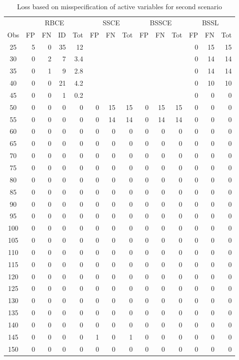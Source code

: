 \documentclass[preprint,12pt]{elsarticle}
\begin{document}
\begin{table}
\small
\caption{Loss based on misspecification of active variables for second scenario}
\label{tab:misspec2}
\begin{tabular}{|c||rrr|r||rr|r||rr|r||rr|r|}
  \hline
  &\multicolumn{4}{c||}{RBCE}&\multicolumn{3}{c||}{SSCE}
  &\multicolumn{3}{c||}{BSSCE}&\multicolumn{3}{c|}{BSSL}\\
  \cline{2-14}
 Obs & FP & FN & ID & Tot & FP & FN & Tot & FP & FN & Tot & FP & FN & Tot \\ 
  \hline
25 &   5 & 0 & 35 & 12 &  &  &  &  &  &  & 0 & 15 & 15 \\ 
  30 & 0 & 2 & 7 & 3.4 &  &  &  &  &  &  & 0 & 14 & 14 \\ 
  35 & 0 & 1 & 9 & 2.8 &  &  &  &  &  &  & 0 & 14 & 14 \\ 
  40 & 0 & 0 & 21 & 4.2 &  &  &  &  &  &  & 0 & 10 & 10 \\ 
  45 & 0 & 0 & 1 & 0.2 &  &  &  &  &  &  & 0 & 0 & 0 \\ 
  50 & 0 & 0 & 0 & 0 & 0 & 15 & 15 & 0 & 15 & 15 & 0 & 0 & 0 \\ 
  55 & 0 & 0 & 0 & 0 & 0 & 14 & 14 & 0 & 14 & 14 & 0 & 0 & 0 \\ 
  60 & 0 & 0 & 0 & 0 & 0 & 0 & 0 & 0 & 0 & 0 & 0 & 0 & 0 \\ 
  65 & 0 & 0 & 0 & 0 & 0 & 0 & 0 & 0 & 0 & 0 & 0 & 0 & 0 \\ 
  70 & 0 & 0 & 0 & 0 & 0 & 0 & 0 & 0 & 0 & 0 & 0 & 0 & 0 \\ 
  75 & 0 & 0 & 0 & 0 & 0 & 0 & 0 & 0 & 0 & 0 & 0 & 0 & 0 \\ 
  80 & 0 & 0 & 0 & 0 & 0 & 0 & 0 & 0 & 0 & 0 & 0 & 0 & 0 \\ 
  85 & 0 & 0 & 0 & 0 & 0 & 0 & 0 & 0 & 0 & 0 & 0 & 0 & 0 \\ 
  90 & 0 & 0 & 0 & 0 & 0 & 0 & 0 & 0 & 0 & 0 & 0 & 0 & 0 \\ 
  95 & 0 & 0 & 0 & 0 & 0 & 0 & 0 & 0 & 0 & 0 & 0 & 0 & 0 \\ 
  100 & 0 & 0 & 0 & 0 & 0 & 0 & 0 & 0 & 0 & 0 & 0 & 0 & 0 \\ 
  105 & 0 & 0 & 0 & 0 & 0 & 0 & 0 & 0 & 0 & 0 & 0 & 0 & 0 \\ 
  110 & 0 & 0 & 0 & 0 & 0 & 0 & 0 & 0 & 0 & 0 & 0 & 0 & 0 \\ 
  115 & 0 & 0 & 0 & 0 & 0 & 0 & 0 & 0 & 0 & 0 & 0 & 0 & 0 \\ 
  120 & 0 & 0 & 0 & 0 & 0 & 0 & 0 & 0 & 0 & 0 & 0 & 0 & 0 \\ 
  125 & 0 & 0 & 0 & 0 & 0 & 0 & 0 & 0 & 0 & 0 & 0 & 0 & 0 \\ 
  130 & 0 & 0 & 0 & 0 & 0 & 0 & 0 & 0 & 0 & 0 & 0 & 0 & 0 \\ 
  135 & 0 & 0 & 0 & 0 & 0 & 0 & 0 & 0 & 0 & 0 & 0 & 0 & 0 \\ 
  140 & 0 & 0 & 0 & 0 & 0 & 0 & 0 & 0 & 0 & 0 & 0 & 0 & 0 \\ 
  145 & 0 & 0 & 0 & 0 & 1 & 0 & 1 & 0 & 0 & 0 & 0 & 0 & 0 \\ 
  150 & 0 & 0 & 0 & 0 & 0 & 0 & 0 & 0 & 0 & 0 & 0 & 0 & 0 \\ 
  \hline
\end{tabular}
\end{table}
\end{document}
